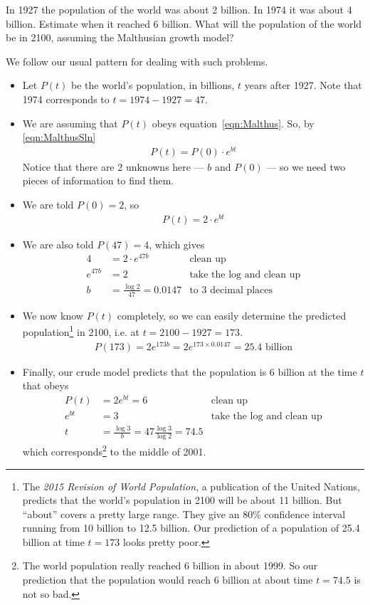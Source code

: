 \begin{eg}\label{eg:SDEpopgthA}
In 1927 the population of the world was about 2 billion.
In 1974 it was about 4 billion. Estimate when it reached
6 billion. What will the population of the world be in 2100,
assuming the Malthusian growth model?

 \soln We follow our usual pattern for dealing with such problems.
 \begin{itemize}
 \item Let $P(t)$ be the world's population, in billions,
$t$ years after 1927.
Note that 1974 corresponds to $t=1974-1927 = 47$.

 \item We are assuming that $P(t)$ obeys equation~\eqref{eqn:Malthus}.
So, by \eqref{eqn:MalthusSln}
 \begin{align*}
           P(t)=P(0)\cdot e^{bt}
 \end{align*}
 Notice that there are 2 unknowns here --- $b$ and $P(0)$
  --- so we need two pieces of information to find them.

 \item We are told $P(0)=2$, so
 \begin{align*}
   P(t)=2\cdot e^{bt}
 \end{align*}
 \item We are also told $P(47)=4$, which gives
 \begin{align*}
   4 &=2\cdot e^{47b} & \text{clean up}\\
   e^{47b}&=2 & \text{take the log and clean up}\\
   b&=\frac{\log 2}{47} = 0.0147 & \text{to 3 decimal places}
 \end{align*}
 \item We now know $P(t)$ completely, so we can easily determine
the predicted population\footnote{The \emph{2015 Revision of
World Population}, a publication of the United Nations, predicts
that the world's population in 2100 will be about 11 billion.
But ``about'' covers a pretty large range. They give an 80\% confidence
interval running from 10 billion to 12.5 billion. Our prediction of a 
population of 25.4 billion at time $t=173$ looks pretty poor.} in 2100,
i.e. at $t=2100-1927 = 173$.
 \begin{align*}
   P(173) = 2 e^{173 b} = 2 e^{173\times 0.0147} = 25.4\text{ billion}
 \end{align*}

\item Finally, our crude model predicts that the population is
6 billion at the time $t$ that obeys
 \begin{align*}
   P(t) &= 2 e^{b t} = 6 & \text{clean up}\\
   e^{b t}&=3 & \text{take the log and clean up}\\
   t&=\frac{\log 3}{b} = 47\frac{\log 3}{\log 2}
                       = 74.5
 \end{align*}
which corresponds\footnote{The world population really reached
6 billion in about 1999. So our prediction that the population would reach 6 billion 
at about time $t=74.5$ is not so bad.} to the middle of 2001.
\end{itemize}
\end{eg}


